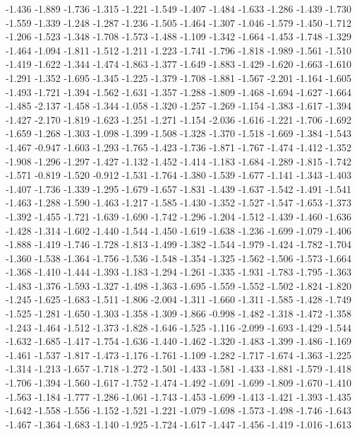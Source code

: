\documentclass[9pt]{article}
\theoremstyle{plain}
\theoremstyle{definition}
\theoremstyle{remark}
\numberwithin{equation}{section}
\begin{document}
-1.436
-1.889
-1.736
-1.315
-1.221
-1.549
-1.407
-1.484
-1.633
-1.286
-1.439
-1.730
-1.559
-1.339
-1.248
-1.287
-1.236
-1.505
-1.464
-1.307
-1.046
-1.579
-1.450
-1.712
-1.206
-1.523
-1.348
-1.708
-1.573
-1.488
-1.109
-1.342
-1.664
-1.453
-1.748
-1.329
-1.464
-1.094
-1.811
-1.512
-1.211
-1.223
-1.741
-1.796
-1.818
-1.989
-1.561
-1.510
-1.419
-1.622
-1.344
-1.474
-1.863
-1.377
-1.649
-1.883
-1.429
-1.620
-1.663
-1.610
-1.291
-1.352
-1.695
-1.345
-1.225
-1.379
-1.708
-1.881
-1.567
-2.201
-1.164
-1.605
-1.493
-1.721
-1.394
-1.562
-1.631
-1.357
-1.288
-1.809
-1.468
-1.694
-1.627
-1.664
-1.485
-2.137
-1.458
-1.344
-1.058
-1.320
-1.257
-1.269
-1.154
-1.383
-1.617
-1.394
-1.427
-2.170
-1.819
-1.623
-1.251
-1.271
-1.154
-2.036
-1.616
-1.221
-1.706
-1.692
-1.659
-1.268
-1.303
-1.098
-1.399
-1.508
-1.328
-1.370
-1.518
-1.669
-1.384
-1.543
-1.467
-0.947
-1.603
-1.293
-1.765
-1.423
-1.736
-1.871
-1.767
-1.474
-1.412
-1.352
-1.908
-1.296
-1.297
-1.427
-1.132
-1.452
-1.414
-1.183
-1.684
-1.289
-1.815
-1.742
-1.571
-0.819
-1.520
-0.912
-1.531
-1.764
-1.380
-1.539
-1.677
-1.141
-1.343
-1.403
-1.407
-1.736
-1.339
-1.295
-1.679
-1.657
-1.831
-1.439
-1.637
-1.542
-1.491
-1.541
-1.463
-1.288
-1.590
-1.463
-1.217
-1.585
-1.430
-1.352
-1.527
-1.547
-1.653
-1.373
-1.392
-1.455
-1.721
-1.639
-1.690
-1.742
-1.296
-1.204
-1.512
-1.439
-1.460
-1.636
-1.428
-1.314
-1.602
-1.440
-1.544
-1.450
-1.619
-1.638
-1.236
-1.699
-1.079
-1.406
-1.888
-1.419
-1.746
-1.728
-1.813
-1.499
-1.382
-1.544
-1.979
-1.424
-1.782
-1.704
-1.360
-1.538
-1.364
-1.756
-1.536
-1.548
-1.354
-1.325
-1.562
-1.506
-1.573
-1.664
-1.368
-1.410
-1.444
-1.393
-1.183
-1.294
-1.261
-1.335
-1.931
-1.783
-1.795
-1.363
-1.483
-1.376
-1.593
-1.327
-1.498
-1.363
-1.695
-1.559
-1.552
-1.502
-1.824
-1.820
-1.245
-1.625
-1.683
-1.511
-1.806
-2.004
-1.311
-1.660
-1.311
-1.585
-1.428
-1.749
-1.525
-1.281
-1.650
-1.303
-1.358
-1.309
-1.866
-0.998
-1.482
-1.318
-1.472
-1.358
-1.243
-1.464
-1.512
-1.373
-1.828
-1.646
-1.525
-1.116
-2.099
-1.693
-1.429
-1.544
-1.632
-1.685
-1.417
-1.754
-1.636
-1.440
-1.462
-1.320
-1.483
-1.399
-1.486
-1.169
-1.461
-1.537
-1.817
-1.473
-1.176
-1.761
-1.109
-1.282
-1.717
-1.674
-1.363
-1.225
-1.314
-1.213
-1.657
-1.718
-1.272
-1.501
-1.433
-1.581
-1.433
-1.881
-1.579
-1.418
-1.706
-1.394
-1.560
-1.617
-1.752
-1.474
-1.492
-1.691
-1.699
-1.809
-1.670
-1.410
-1.563
-1.184
-1.777
-1.286
-1.061
-1.743
-1.453
-1.699
-1.413
-1.421
-1.393
-1.435
-1.642
-1.558
-1.556
-1.152
-1.521
-1.221
-1.079
-1.698
-1.573
-1.498
-1.746
-1.643
-1.467
-1.364
-1.683
-1.140
-1.925
-1.724
-1.617
-1.447
-1.456
-1.419
-1.016
-1.613
\end{document}
